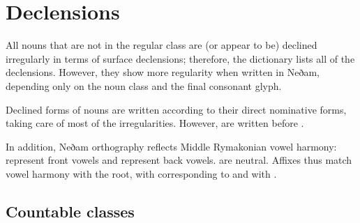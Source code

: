 \documentclass{book}
\newcommand{\northo}[1]{\ortho{\textnedham{#1}}}
\begin{document}
\section{Declensions}

All nouns that are not in the regular class are (or appear to be) declined irregularly in terms of surface declensions; therefore, the dictionary lists all of the declensions. However, they show more regularity when written in Neðam, depending only on the noun class and the final consonant glyph.

Declined forms of nouns are written according to their direct nominative forms, taking care of most of the irregularities. However,  are written  before .

In addition, Neðam orthography reflects Middle Rymakonian vowel harmony: \northo{e i} represent front vowels and \northo{o u} represent back vowels. \northo{a y} are neutral. Affixes thus match vowel harmony with the root, with \northo{e} corresponding to \northo{o} and \northo{i} with \northo{u}.

\subsection{Countable classes}
\end{document}
